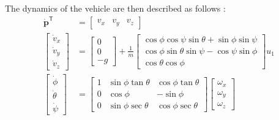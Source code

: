 \documentclass[letterpaper, 10 pt, conference]{ieeeconf}  %
\begin{document}
The dynamics of the vehicle are then described as follows \cite{esencite}:
\begin{equation} \label{eq:quadrotor_dynamics} 
	\begin{aligned}
	\dot{\bm{p}}^{\mathsf{T}} &= \begin{bmatrix}v_x & v_y & v_z\end{bmatrix}\\
	\begin{bmatrix}\dot{v}_x \\ \dot{v}_y \\ \dot{v}_z\end{bmatrix} &= \begin{bmatrix}0 \\ 0 \\ -g \end{bmatrix} + \frac{1}{m} \begin{bmatrix}\cos\phi \cos\psi \sin\theta + \sin\phi \sin\psi \\ \cos\phi \sin\theta \sin\psi - \cos\psi \sin\phi \\ \cos\theta \cos\phi \end{bmatrix} u_1\\
	\begin{bmatrix}\dot{\phi} \\ \dot{\theta} \\ \dot{\psi}\end{bmatrix} &= \begin{bmatrix}1 & \sin\phi \tan\theta & \cos\phi \tan\theta\\ 0 & \cos\phi & -\sin\phi \\ 0 & \sin\phi \sec\theta & \cos\phi \sec\theta \end{bmatrix} \begin{bmatrix}\omega_{x} \\ \omega_{y} \\ \omega_{z} \end{bmatrix}\\

\end{aligned}
\end{equation}
\end{document}
